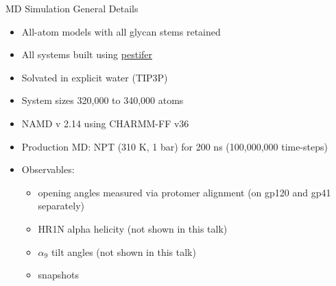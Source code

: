 \begin{frame}[fragile]{MD Simulation General Details}
    \begin{itemize}
        \item All-atom models with all glycan stems retained
        \item All systems built using \href{https://pestifer.readthedocs.io/en/latest/}{pestifer}
        \item Solvated in explicit water (TIP3P)
        \item System sizes 320,000 to 340,000 atoms
        \item NAMD v 2.14 using CHARMM-FF v36
        \item Production MD: NPT (310 K, 1 bar) for 200 ns (100,000,000 time-steps)
        \item Observables:
        \begin{itemize}
            \item opening angles measured via protomer alignment (on gp120 and gp41 separately)
            \item HR1N alpha helicity (not shown in this talk)
            \item $\alpha_9$ tilt angles (not shown in this talk)
            \item snapshots
        \end{itemize}
    \end{itemize}
\end{frame}

